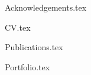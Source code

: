 \documentclass[10pt,twoside,openright]{memoir}
\begin{document}
{Acknowledgements.tex}
\clearemptydoublepageodd

{CV.tex}
\clearemptydoublepageodd

{Publications.tex}
\clearemptydoublepageodd

{Portfolio.tex}
\clearemptydoublepageodd

\printglossary[type=\acronymtype]
\clearemptydoublepageodd

\newrefcontext[sorting=none]
\printbibliography[heading=bibintoc]

\ifx\setcover\empty
\else
	
\fi
\end{document}

